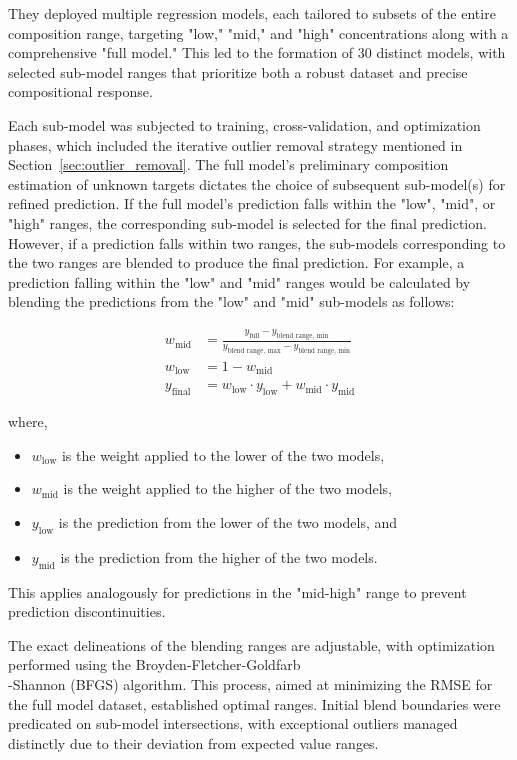 They deployed multiple regression models, each tailored to subsets of the entire composition range, targeting "low," "mid," and "high" concentrations along with a comprehensive "full model." This led to the formation of 30 distinct models, with selected sub-model ranges that prioritize both a robust dataset and precise compositional response.

Each sub-model was subjected to training, cross-validation, and optimization phases, which included the iterative outlier removal strategy mentioned in Section~\ref{sec:outlier_removal}.
The full model's preliminary composition estimation of unknown targets dictates the choice of subsequent sub-model(s) for refined prediction.
If the full model's prediction falls within the "low", "mid", or "high" ranges, the corresponding sub-model is selected for the final prediction.
However, if a prediction falls within two ranges, the sub-models corresponding to the two ranges are blended to produce the final prediction.
For example, a prediction falling within the "low" and "mid" ranges would be calculated by blending the predictions from the "low" and "mid" sub-models as follows:

\begin{align*}
w_{\text{mid}} &= \frac{y_{\text{full}}-y_{\text{blend range, min}}}{y_{\text{blend range, max}} - y_{\text{blend range, min}}} \\
w_{\text{low}} &= 1 - w_{\text{mid}} \\
y_{\text{final}} &= w_{\text{low}}\cdot y_{\text{low}} + w_{\text{mid}}\cdot y_{\text{mid}}
\end{align*}

where,

\begin{itemize}
    \item $w_{\text{low}}$ is the weight applied to the lower of the two models,
    \item $w_{\text{mid}}$ is the weight applied to the higher of the two models,
    \item $y_{\text{low}}$ is the prediction from the lower of the two models, and
    \item $y_{\text{mid}}$ is the prediction from the higher of the two models.
\end{itemize}

This applies analogously for predictions in the "mid-high" range to prevent prediction discontinuities.

The exact delineations of the blending ranges are adjustable, with optimization performed using the Broyden-Fletcher-Goldfarb\\-Shannon (BFGS) algorithm. This process, aimed at minimizing the RMSE for the full model dataset, established optimal ranges. Initial blend boundaries were predicated on sub-model intersections, with exceptional outliers managed distinctly due to their deviation from expected value ranges.

